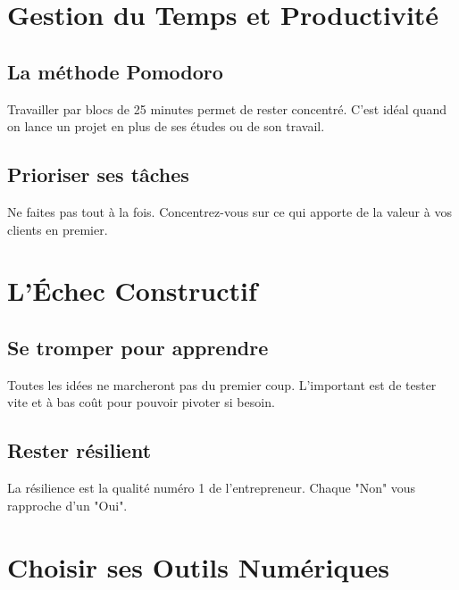 \documentclass[12pt,a4paper]{report}
\begin{document}
\newpage

\chapter{Gestion du Temps et Productivité}

\section{La méthode Pomodoro}
Travailler par blocs de 25 minutes permet de rester concentré. C'est idéal quand on lance un projet en plus de ses études ou de son travail.

\section{Prioriser ses tâches}
Ne faites pas tout à la fois. Concentrez-vous sur ce qui apporte de la valeur à vos clients en premier.

\newpage

\chapter{L'Échec Constructif}

\section{Se tromper pour apprendre}
Toutes les idées ne marcheront pas du premier coup. L'important est de tester vite et à bas coût pour pouvoir pivoter si besoin.

\section{Rester résilient}
La résilience est la qualité numéro 1 de l'entrepreneur. Chaque "Non" vous rapproche d'un "Oui".

\newpage

\chapter{Choisir ses Outils Numériques}
\end{document}
